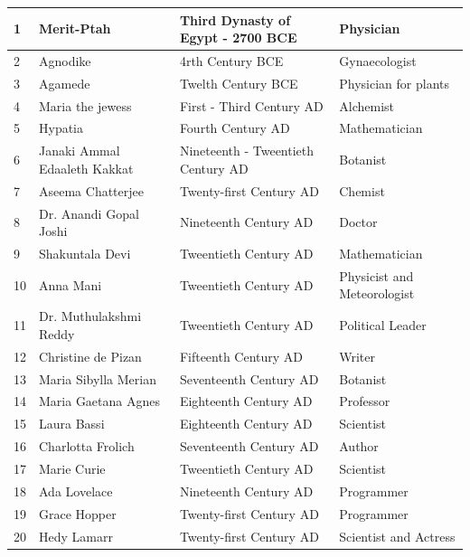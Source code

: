 \documentclass[a4paper,10pt]{article}
\begin{document}
\begin{center}
\begin{table}[h]
\begin{tabular}{|l|l|l|l|}
  1 & Merit-Ptah & Third Dynasty of Egypt - 2700 BCE & Physician\\
  \hline
  2 & Agnodike & 4rth Century BCE & Gynaecologist\\
  \hline
  3 & Agamede & Twelth Century BCE & Physician for plants\\
  \hline
  4 & Maria the jewess & First - Third Century AD & Alchemist\\
  \hline
  5 & Hypatia & Fourth Century AD & Mathematician\\
  \hline
  6 & Janaki Ammal Edaaleth Kakkat & Nineteenth - Tweentieth Century AD & Botanist\\
  \hline
  7 & Aseema Chatterjee & Twenty-first Century AD & Chemist\\
  \hline
  8 & Dr. Anandi Gopal Joshi & Nineteenth Century AD & Doctor\\
  \hline
  9 & Shakuntala Devi & Tweentieth Century AD & Mathematician\\
  \hline
  10 & Anna Mani & Tweentieth Century AD & Physicist and Meteorologist\\
  \hline
  11 & Dr. Muthulakshmi Reddy & Tweentieth Century AD & Political Leader\\
  \hline
  12 & Christine de Pizan & Fifteenth Century AD & Writer\\
  \hline
  13 & Maria Sibylla Merian & Seventeenth Century AD & Botanist\\
  \hline
  14 & Maria Gaetana Agnes & Eighteenth Century AD & Professor\\
  \hline
  15 & Laura Bassi & Eighteenth Century AD & Scientist\\
  \hline
  16 & Charlotta Frolich & Seventeenth Century AD & Author\\
  \hline
  17 & Marie Curie & Tweentieth Century AD & Scientist \\
  \hline
  18 & Ada Lovelace & Nineteenth Century AD & Programmer\\
  \hline
  19 & Grace Hopper & Twenty-first Century AD & Programmer\\
  \hline
  20 & Hedy Lamarr & Twenty-first Century AD& Scientist and Actress\\
\hline\hline  
 \end{tabular}

\end{table}


\end{center}
\end{document}
